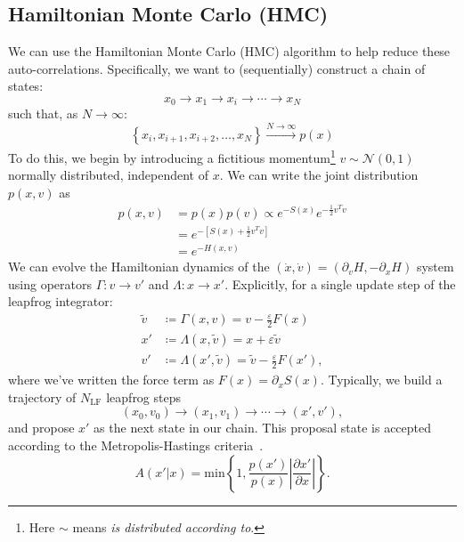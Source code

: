 \documentclass[a4paper,11pt]{article}
\begin{document}
\subsection{\label{subsec:hmc}Hamiltonian Monte Carlo (HMC)}
%
We can use the Hamiltonian Monte Carlo (HMC) algorithm to help reduce these auto-correlations.
%
Specifically, we want to (sequentially) construct a chain of states:
%
\begin{equation}
x_{0} \rightarrow x_{1} \rightarrow x_{i} \rightarrow \cdots \rightarrow x_{N}
\end{equation}
%
such that, as $N \rightarrow \infty$:
%
\begin{equation}
\left\{x_{i}, x_{i+1}, x_{i+2}, \ldots, x_{N}\right\} \xrightarrow[]{N\rightarrow\infty} p(x)
\end{equation}
%
To do this, we begin by introducing a fictitious momentum\footnote{Here $\sim$ means \textit{is distributed according to}.} $v \sim \mathcal{N}(0, 1)$ normally distributed, independent of $x$.
%
We can write the joint distribution $p(x, v)$ as
%
\begin{align}
p(x, v) &= p(x) p(v) \propto e^{-S(x)} e^{-\frac{1}{2} v^{T}v} \\
&= e^{-\left[S(x) + \frac{1}{2} v^{T} v \right]} \\
&= e^{-H(x, v)}
\end{align}
%
We can evolve the Hamiltonian dynamics of the $(\dot{x}, \dot{v}) = (\partial_{v} H, -\partial_{x} H)$ system using operators $\Gamma: v \rightarrow v'$ and $\Lambda: x \rightarrow x'$.
%
Explicitly, for a single update step of the leapfrog integrator:
%
\begin{align}
\tilde{v} &\coloneqq \Gamma(x, v) = v - \frac{\varepsilon}{2} F(x) \\
x' &\coloneqq \Lambda(x, \tilde{v}) = x + \varepsilon \tilde{v} \\
v' &\coloneqq \Lambda(x', \tilde{v}) = \tilde{v} - \frac{\varepsilon}{2} F(x'),
\end{align}
%
where we've written the force term as $F(x) = \partial_{x}S(x)$.
%
Typically, we build a trajectory of $N_{\mathrm{LF}}$ leapfrog steps
%
\begin{equation}
(x_{0}, v_{0}) \rightarrow (x_{1}, v_{1}) \rightarrow \cdots \rightarrow (x', v'),
\end{equation}
%
and propose $x'$ as the next state in our chain.
%
This proposal state is accepted according to the Metropolis-Hastings criteria~\cite{mh}.
%
\begin{equation}
A(x'|x) = \mathrm{min}\left\{{1, \frac{p(x')}{p(x)} \left| \frac{\partial x'}{\partial x} \right|}\right\}.
\end{equation}
%
\end{document}

